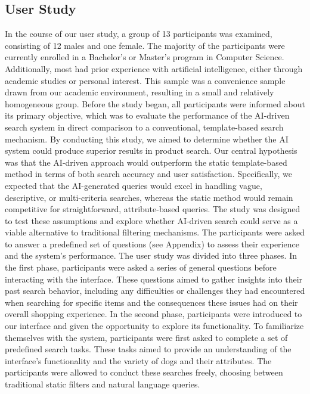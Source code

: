 \documentclass[../../submission.tex]{subfiles}
\begin{document}
\subsection{User Study}
In the course of our user study, a group of 13 participants was examined, consisting of 12 males and one female. 
The majority of the participants were currently enrolled in a Bachelor's or Master's program in Computer Science. 
Additionally, most had prior experience with artificial intelligence, either through academic studies or personal interest.
This sample was a convenience sample drawn from our academic environment, resulting in a small and relatively homogeneous group. 
Before the study began, all participants were informed about its primary objective, which was to evaluate the 
performance of the AI-driven search system in direct comparison to a conventional, template-based search mechanism. 
By conducting this study, we aimed to determine whether the AI system could produce superior results in product search. 
Our central hypothesis was that the AI-driven approach would outperform the static template-based method in terms of 
both search accuracy and user satisfaction. Specifically, we expected that the AI-generated queries would excel in 
handling vague, descriptive, or multi-criteria searches, whereas the static method would remain competitive for 
straightforward, attribute-based queries. The study was designed to test these assumptions and explore whether 
AI-driven search could serve as a viable alternative to traditional filtering mechanisms. The participants were 
asked to answer a predefined set of questions (see Appendix) to assess their experience and the system's performance. 
The user study was divided into three phases. In the first phase, participants were asked a series of general 
questions before interacting with the interface. These questions aimed to gather insights into their past search 
behavior, including any difficulties or challenges they had encountered when searching for specific items and the 
consequences these issues had on their overall shopping experience. In the second phase, participants were introduced
 to our interface and given the opportunity to explore its functionality. To familiarize themselves with the system, 
 participants were first asked to complete a set of predefined search tasks. These tasks aimed to provide an understanding
  of the interface’s functionality and the variety of dogs and their attributes. The participants were allowed to 
  conduct these searches freely, choosing between traditional static filters and natural language queries. 
\end{document}

